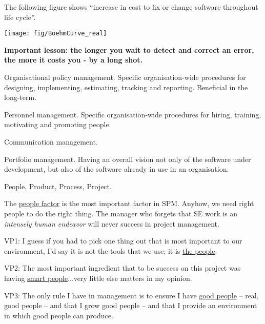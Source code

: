 \documentclass[landscape,30pt]{foils}
\begin{document}
The following figure shows ``increase in cost to fix or change software
throughout life cycle''.

\begin{center}
\texttt{[image: fig/BoehmCurve\_real]}
\end{center}

{\bf Important lesson: the longer you wait to detect and correct an error, the more it costs you - by a long shot.}




Organisational policy management. Specific organisation-wide procedures for designing, implementing, estimating, tracking and reporting.  Beneficial in the long-term.

Personnel management.   Specific organisation-wide procedures for hiring, training, motivating and promoting people.

Communication management.

Portfolio management.  Having an overall vision not only of the software under development, but also of the software already in use in an organisation.  




People, Product, Process, Project.


The \underline{people factor} is the most important factor in SPM.  Anyhow, we need right people to do the right thing.
The manager who forgets that SE work is an {\em intensely human endeavor} will never success in project management.

\newpage
VP1: I guess if you had to pick one thing out that is most important to our environment, I'd say it is not the tools that we use; it is \underline{the people}.

VP2: The most important ingredient that to be success on this project was having \underline{smart people}...very little else matters in my opinion.

VP3: The only rule I have in management is to ensure I have \underline{good people} -- real, good people -- and that I grow good people -- and that I provide an environment in which good people can produce.
\end{document}
